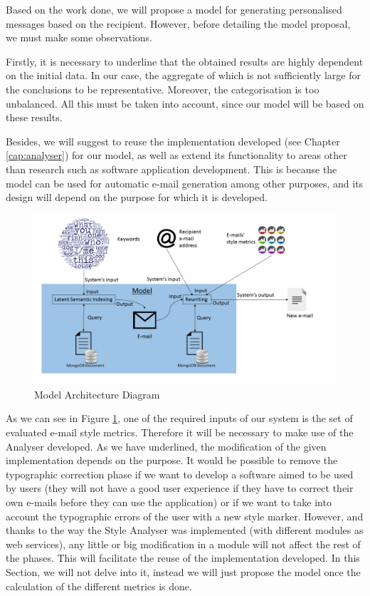 Based on the work done, we will propose a model for generating personalised messages based on the recipient. However, before detailing the model proposal, we must make some observations.

Firstly, it is necessary to underline that the obtained results are highly dependent on the initial data. In our case, the aggregate of which is not sufficiently large for the conclusions to be representative. Moreover, the categorisation is too unbalanced. All this must be taken into account, since our model will be based on these results.

Besides, we will suggest to reuse the implementation developed (see Chapter \ref{cap:analyser}) for our model, as well as extend its functionality to areas other than research such as software application development. This is because the model can be used for automatic e-mail generation among other purposes, and its design will depend on the purpose for which it is developed.

\begin{figure}
	\centering%
	\centerline{\includegraphics[width = 1.2\textwidth]{Imagenes/Bitmap/model.png}}%
	\caption{Model Architecture Diagram}%
	\label{fig:modarch}
\end{figure}

As we can see in Figure \ref{fig:modarch}, one of the required inputs of our system is the set of evaluated e-mail style metrics. Therefore it will be necessary to make use of the Analyser developed. As we have underlined, the modification of the given implementation depends on the purpose. It would be possible to remove the typographic correction phase if we want to develop a software aimed to be used by users (they will not have a good user experience if they have to correct their own e-mails before they can use the application) or if we want to take into account the typographic errors of the user with a new style marker. However, and thanks to the way the Style Analyser was implemented (with different modules as web services), any little or big modification in a module will not affect the rest of the phases. This will facilitate the reuse of the implementation developed. In this Section, we will not delve into it, instead we will just propose the model once the calculation of the different metrics is done.

